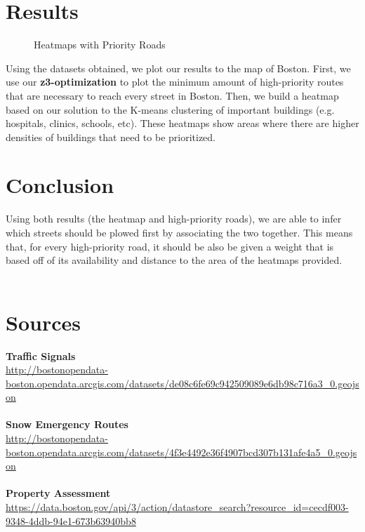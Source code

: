 \documentclass[15pt]{report}
\begin{document}
\section*{Results}
\begin{figure}[h!]
	\centering
	\caption{Heatmaps with Priority Roads}
	\label{fig:method}
\end{figure} 
\noindent Using the datasets obtained, we plot our results to the map of Boston. First, we use our \textbf{z3-optimization} to plot the minimum amount of high-priority routes that are necessary to reach every street in Boston. Then, we build a heatmap based on our solution to the K-means clustering of important buildings (e.g. hospitals, clinics, schools, etc). These heatmaps show areas where there are higher densities of buildings that need to be prioritized. 

\section*{Conclusion}
Using both results (the heatmap and high-priority roads), we are able to infer which streets should be plowed first by associating the two together. This means that, for every high-priority road, it should be also be given a weight that is based off of its availability and distance to the area of the heatmaps provided. \\\\
\section*{Sources}
\sloppy 
\textbf{Traffic Signals} \\
\url{http://bostonopendata-boston.opendata.arcgis.com/datasets/de08c6fe69c942509089e6db98c716a3_0.geojson} \\\\
\textbf{Snow Emergency Routes} \\
\url{http://bostonopendata-boston.opendata.arcgis.com/datasets/4f3e4492e36f4907bcd307b131afe4a5_0.geojson} \\\\
\textbf{Property Assessment} \\
\url{https://data.boston.gov/api/3/action/datastore_search?resource_id=cecdf003-9348-4ddb-94e1-673b63940bb8}
\end{document}
